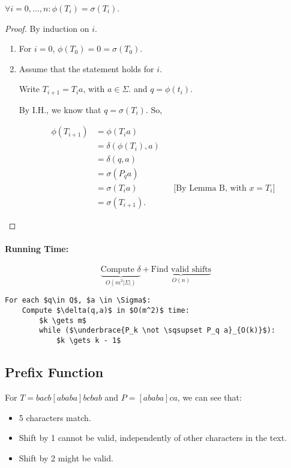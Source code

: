 \begin{theorem}
	$\forall i=0,\ldots, n: \phi(T_i) = \sigma(T_i)$.
\end{theorem}
\begin{proof}
	By induction on $i$.
	\begin{enumerate}
		\item For $i=0$, $\phi(T_0) = 0 = \sigma(T_0)$.
		\item Assume that the statement holds for $i$.
		
		Write $T_{i+1} = T_i a$, with $a \in \Sigma$. and $q = \phi(t_i)$.
		
		By I.H., we know that $q = \sigma(T_i)$. So,
		
		\begin{align*}
		\phi(T_{i+1}) &= \phi(T_i a) \\
		&= \delta(\phi(T_i), a) \\
		&= \delta(q,a) \\
		&= \sigma(P_q a) \\
		&= \sigma(T_i a) && \text{[By Lemma B, with $x = T_i$]}\\
		&= \sigma(T_{i+1}).
		\end{align*}
	\end{enumerate}
\end{proof}

\paragraph{Running Time:}

$$\underbrace{\text{Compute $\delta$}}_{O(m^3 |\Sigma|)} + \underbrace{\text{Find valid shifts}}_{O(n)}$$

\begin{lstlisting}[mathescape]
For each $q\in Q$, $a \in \Sigma$:
	Compute $\delta(q,a)$ in $O(m^2)$ time:
		$k \gets m$
		while ($\underbrace{P_k \not \sqsupset P_q a}_{O(k)}$):
			$k \gets k - 1$
\end{lstlisting}

\subsection{Prefix Function}

For $T = bacb[ababa]bcbab$ and $P = [ababa]ca$, we can see that:

\begin{itemize}
	\item 5 characters match.
	\item Shift by 1 cannot be valid, independently of other characters in the text.
	\item Shift by 2 might be valid.
\end{itemize}

